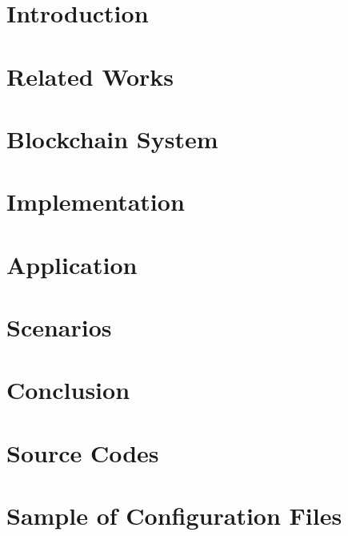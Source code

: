 \documentclass[12pt,twoside,openright]{report}
\makeatletter
\def\cleardoublepage{\clearpage\if@twoside \ifodd\c@page\else
    \hbox{}
    \thispagestyle{empty}
    \newpage
    \if@twocolumn\hbox{}\newpage\fi\fi\fi}
\makeatother
\begin{document}

\cleardoublepage


\cleardoublepage


\cleardoublepage


\cleardoublepage

\tableofcontents

\listoffigures
 
\listoftables

\listofalgorithms

\chapter{Introduction}


\chapter{Related Works}


\chapter{Blockchain System}


\chapter{Implementation}


\chapter{Application}


\chapter{Scenarios}


\chapter{Conclusion}





\appendix
\chapter{Source Codes}


\chapter{Sample of Configuration Files}

\end{document}
